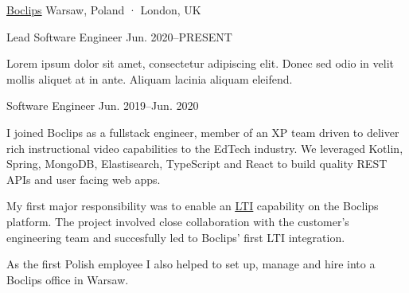 
\begin{cventries}

  \multicventry
    {\href{https://www.boclips.com}{Boclips}} %
    {Warsaw, Poland · London, UK} %
    {
      \multicventryitem
        {Lead Software Engineer} %
        {Jun. 2020–PRESENT} %
        {
          \begin{cvitems} %
            \item {Lorem ipsum dolor sit amet, consectetur adipiscing elit. Donec sed odio in velit mollis aliquet at in ante. Aliquam lacinia aliquam eleifend.}
          \end{cvitems}
        }
      \multicventryitem
        {Software Engineer} %
        {Jun. 2019–Jun. 2020} %
        {
          \begin{cvitems} %
            \item {I joined Boclips as a fullstack engineer, member of an XP team driven to deliver rich instructional video capabilities to the EdTech industry. We leveraged Kotlin, Spring, MongoDB, Elastisearch, TypeScript and React to build quality REST APIs and user facing web apps.}
            \item {My first major responsibility was to enable an \href{https://www.imsglobal.org/activity/learning-tools-interoperability}{\underline{LTI}} capability on the Boclips platform. The project involved close collaboration with the customer's engineering team and succesfully led to Boclips' first LTI integration.}
            \item {As the first Polish employee I also helped to set up, manage and hire into a Boclips office in Warsaw.}
          \end{cvitems}
        }
    }


\end{cventries}
